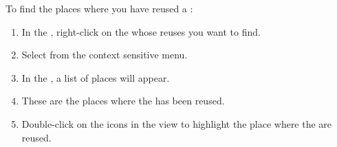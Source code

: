 
To find the places where you have reused a \gdcase{}:
\begin{enumerate}
\item In the \gdtestcasebrowser{}, right-click on the \gdcase{} whose reuses you want to find.
\item Select  from the context sensitive menu.
\item In the  , a list of places will appear.
\item These are the places where the \gdcase{} has been reused. 
\item Double-click on the \gdcase{} icons in the view to highlight the place where the \gdcases{} are reused.
\end{enumerate}
